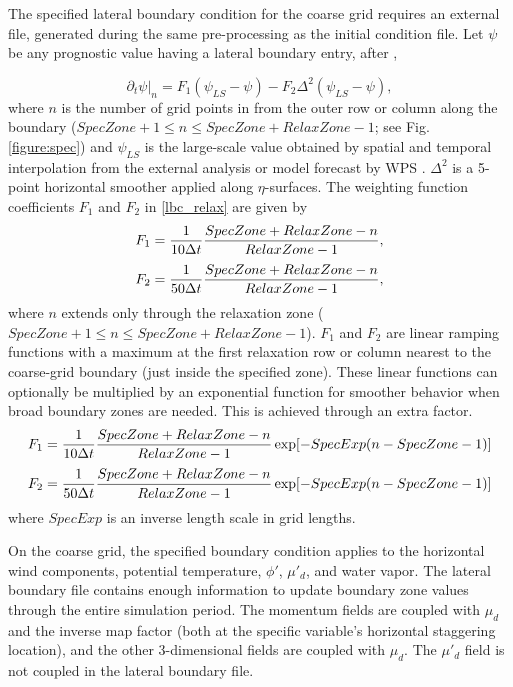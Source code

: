 The specified lateral boundary condition for the coarse grid 
requires an external file, generated
during the same pre-processing as the initial condition file.
Let $\psi$ be any prognostic value having a lateral boundary entry, after \cite{daviesturner77},

\begin{equation}
\partial_t \psi \big|_n = F_1(\psi_{LS} - \psi) - F_2 \Delta^2(\psi_{LS} - \psi),
\label{lbc_relax}
\end{equation}
\noindent where $n$ is the number of grid points in from the outer row or column along the boundary
($SpecZone + 1 \leq n \leq SpecZone + RelaxZone - 1$; see Fig. \ref{figure:spec}) 
and $\psi_{LS}$ is the large-scale value obtained by spatial and temporal interpolation from the external analysis or model forecast by WPS .  $\Delta^2$
is a 5-point horizontal smoother applied along $\eta$-surfaces.
The weighting function
coefficients $F_1$ and $F_2$ in \eqref{lbc_relax} are given by
\begin{equation}
F_1 = {1 \over {10 \Delta t }} {{SpecZone + RelaxZone - n} \over {RelaxZone - 1}},
\notag
\end{equation}
\begin{equation}
F_2 = {1 \over {50 \Delta t }} {{SpecZone + RelaxZone - n} \over {RelaxZone - 1}},
\notag
\end{equation}
\noindent where $n$ extends only through the relaxation zone 
($SpecZone + 1 \leq n \leq SpecZone + RelaxZone - 1$).
$F_1$ and $F_2$ are
linear ramping functions with a maximum at the first relaxation row or column 
nearest to the coarse-grid boundary (just inside the specified zone).  
These linear functions can optionally be multiplied by an
exponential function for smoother behavior when broad boundary zones are
needed. This is achieved through an extra factor.
\begin{equation}
F_1 = {1 \over {10 \Delta t }} {{SpecZone + RelaxZone - n} \over {RelaxZone - 1}}
\exp [ - SpecExp ( n - SpecZone - 1)]
\notag
\end{equation}
\begin{equation}
F_2 = {1 \over {50 \Delta t }} {{SpecZone + RelaxZone - n} \over {RelaxZone - 1}}
\exp [ - SpecExp ( n - SpecZone - 1)]
\notag
\end{equation}
where $SpecExp$ is an inverse length scale in grid lengths.

On the coarse grid, the specified boundary condition applies to 
the horizontal wind components, potential temperature, $\phi'$, $\mu'_d$, and water vapor. 
The lateral boundary file contains enough information to update
boundary zone values through the entire simulation period.  The momentum fields are 
coupled with $\mu_d$ and the inverse map factor (both at the specific variable's
horizontal staggering location), and the other 3-dimensional fields are coupled with
$\mu_d$.  The $\mu'_d$ field is not coupled in the lateral boundary file.

